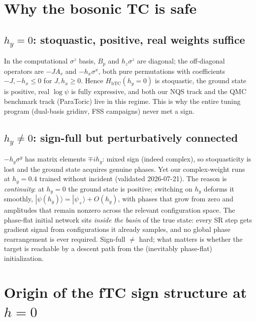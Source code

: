\documentclass[11pt]{article}
\newcommand{\Av}{A_v}
\newcommand{\Bp}{B_p}
\newcommand{\ket}[1]{|#1\rangle}
\newcommand{\sx}{\sigma^x}
\newcommand{\sy}{\sigma^y}
\newcommand{\sz}{\sigma^z}
\begin{document}
\section{Why the bosonic TC is safe}

\subsection{$h_y=0$: stoquastic, positive, real weights suffice}
In the computational $\sz$ basis, $\Bp$ and $h_z\sz$ are diagonal; the
off-diagonal operators are $-J\Av$ and $-h_x\sx$, both pure permutations with
coefficients $-J,-h_x\le0$ for $J,h_x\ge0$. Hence $H_{\mathrm{bTC}}(h_y{=}0)$
is stoquastic, the ground state is positive, real $\log\psi$ is fully
expressive, and both our NQS track and the QMC benchmark track (ParaToric)
live in this regime. This is why the entire tuning program (dual-basis
gridinv, FSS campaigns) never met a sign.

\subsection{$h_y\neq0$: sign-full but perturbatively connected}
$-h_y\sy$ has matrix elements $\mp i h_y$: mixed sign (indeed complex), so
stoquasticity is lost and the ground state acquires genuine phases. Yet our
complex-weight runs at $h_y=0.4$ trained without incident (validated
2026-07-21). The reason is \emph{continuity}: at $h_y=0$ the ground state is
positive; switching on $h_y$ deforms it smoothly, $\ket{\psi(h_y)}=
\ket{\psi_+}+O(h_y)$, with phases that grow from zero and amplitudes that
remain nonzero across the relevant configuration space. The phase-flat initial
network sits \emph{inside the basin} of the true state: every SR step gets
gradient signal from configurations it already samples, and no global phase
rearrangement is ever required. Sign-full $\neq$ hard; what matters is whether
the target is reachable by a descent path from the (inevitably phase-flat)
initialization.

\section{Origin of the fTC sign structure at $h=0$}
\label{sec:origin}
\end{document}
